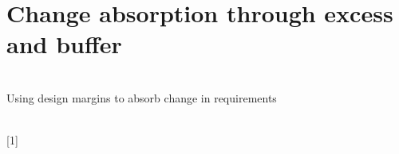 \section{Change absorption through excess and buffer}
\begin{frame}[c,noframenumbering]
	\centering
	\begin{titleblock}{}
		~\\%
		{\centering\LARGE Using design margins to absorb change in requirements \ifshowcitations\footnotemark[1]\fi\\}%
		~\\%
	\end{titleblock}
	{\color{white}\ifshowcitations{}\fi}
\end{frame}
\addtocounter{footnote}{-1}
